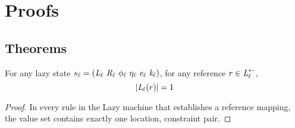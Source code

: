\section{Proofs}



\subsection{Theorems}
\begin{lemma}
\label{lem:lazyrefprops}
For any lazy state $s_\ell = ( \cfgnt{L}_\ell\ \cfgnt{R}_\ell\ \phi_\ell\ \eta_\ell\ \cfgnt{e}_\ell\ \cfgnt{k}_\ell )$, for any reference $r \in \emph{L}_\ell^\leftarrow$, 
$$ | \emph{L}_\ell ( r) | = 1 $$
\end{lemma}

\begin{proof}
In every rule in the Lazy machine that establishes a reference mapping, the value set contains exactly one location, constraint pair. 
\end{proof}

